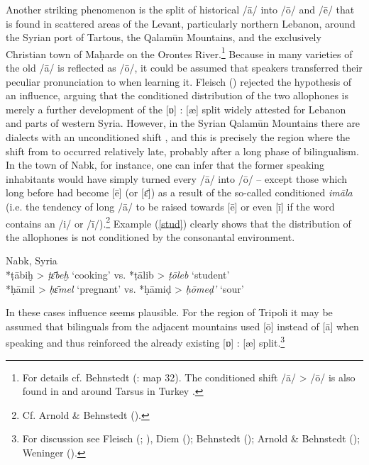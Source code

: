 \documentclass[output=paper]{langsci/langscibook}
\begin{document}
Another striking phenomenon is the split of historical /ā/ into /ō/ and /ē/ that is found in scattered areas of the Levant, particularly northern Lebanon, around the Syrian port of Tartous, the Qalamūn Mountains, and the exclusively Christian town of Maḥarde on the Orontes River.\footnote{For details cf. Behnstedt (\citeyear{Behnstedt1997}: map 32). The conditioned shift /ā/ > /ō/ is also found in and around Tarsus in Turkey \citep[37--38]{Procházka2002Cukurova}.} Because in many varieties of  the old  /ā/ is reflected as /ō/, it could be assumed that  speakers transferred their peculiar pronunciation to  when learning it. Fleisch (\citeyear[49]{Fleisch1974vowels}) rejected the hypothesis of an  influence, arguing that the conditioned distribution of the two allophones is merely a further development of the [ɒ] : [æ] split widely attested for Lebanon and parts of western Syria. However, in the Syrian Qalamūn Mountains there are dialects with an unconditioned shift \citep{Behnstedt1992}, and this is precisely the region where the shift from  to  occurred relatively late, probably after a long phase of {bilingualism}. In the town of Nabk, for instance, one can infer that the former  speaking inhabitants would have simply turned every /ā/ into /ō/ – except those which long before had become [ē] (or [ɛ̄]) as a result of the so-called conditioned \textit{imāla} (i.e. the tendency of long /ā/ to be raised towards [ē] or even [ī] if the word contains an /i/ or /ī/).\footnote{Cf. Arnold \& Behnstedt (\citeyear[68]{ArnoldBehnstedt1993}).} Example (\ref{stud}) clearly shows that the distribution of the allophones is not conditioned by the consonantal environment.

\ea \label{stud}
{Nabk, Syria \citep[20]{Gralla2006}} \\
    \textup{} *ṭābiḫ > \textit{ṭɛ̄beḫ}  \textup{‘cooking’ vs. } *ṭālib > \textit{ṭōleb}  \textup{‘student’}\\
\textup{} *ḥāmil > \textit{ḥɛ̄mel} \textup{‘pregnant’ vs. } *ḥāmiḍ > \textit{ḥōmeḍ’} \textup{‘sour’}\\
\z

In these cases  influence seems plausible. For the region of Tripoli it may be assumed that  bilinguals from the adjacent mountains used [ō] instead of [ā] when speaking  and thus reinforced the already existing [ɒ] : [æ] split.\footnote{For discussion see Fleisch (\citeyear[48--50]{Fleisch1974vowels}; \citeyear[133--136]{Fleisch1974Kfar}), Diem (\citeyear[45--46]{Diem1979}); Behnstedt (\citeyear{Behnstedt1992}); Arnold \& Behnstedt (\citeyear[67--68]{ArnoldBehnstedt1993}); Weninger (\citeyear[748]{Weninger2011Aramaic}).}
\end{document}
